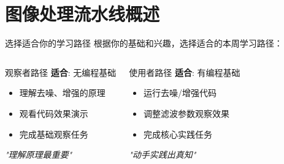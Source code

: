 
\section{图像处理流水线概述}

\begin{frame}{选择适合你的学习路径}
    根据你的基础和兴趣，选择适合的本周学习路径：

    \begin{columns}[t]
        \begin{block}{观察者路径}
            \textbf{适合}: 无编程基础
            \vspace{0.2cm}
            \begin{itemize}
                \small
                \item 理解去噪、增强的原理
                \item 观看代码效果演示
                \item 完成基础观察任务
            \end{itemize}
            \vspace{0.2cm}
            \centering
            \textit{"理解原理最重要"}
        \end{block}

        \begin{block}{使用者路径}
            \textbf{适合}: 有编程基础
            \vspace{0.2cm}
            \begin{itemize}
                \small
                \item 运行去噪/增强代码
                \item 调整滤波参数观察效果
                \item 完成核心实践任务
            \end{itemize}
            \vspace{0.2cm}
            \centering
            \textit{"动手实践出真知"}
        \end{block}


\end{columns}
\end{frame}
